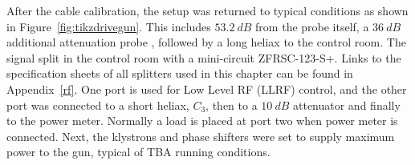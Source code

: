 \label{gunenergy}
After the cable calibration, the setup was returned to typical  conditions as 
shown in Figure~\ref{fig:tikzdrivegun}. This includes $\SI{53.2}{dB}$ from the  probe itself, a $\SI{36}{dB}$ additional attenuation  probe , followed by a long heliax to the 
control room. The signal  split in the control room with a mini-circuit ZFRSC-123-S+. 
Links to the specification sheets of all splitters used in this chapter can be found in Appendix~\ref{rf}.
One port is used for Low Level RF (LLRF) control, and the other port was connected to a short 
heliax, $C_3$, then to a $\SI{10}{dB}$ attenuator and finally to the 
power meter. Normally a load is placed at port two when  power meter is  connected. 
Next, the klystrons and phase shifters were set to supply 
maximum power to the gun, typical of TBA running conditions. 
\def \delayvertical {1.5}
\iftrue
